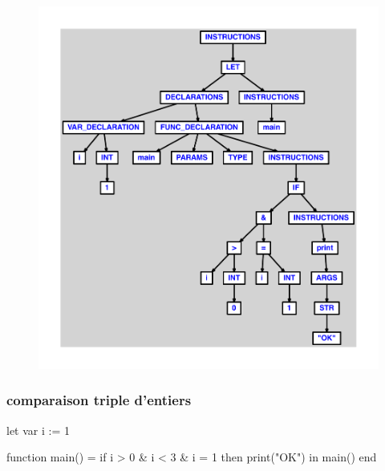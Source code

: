 \documentclass{article}
\begin{document}
\begin{figure}[H]\centering\includegraphics[max width=\textwidth]{ast/ast_173.pdf}\end{figure}\subsubsection{comparaison triple d'entiers}
\begin{verbatimtab}
let
	var i := 1

	function main() =
		if i > 0 & i < 3 & i = 1 then print("OK")
in main() end
\end{verbatimtab}
\end{document}
